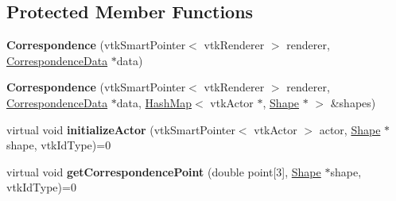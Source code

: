 \subsection*{Protected Member Functions}
\begin{DoxyCompactItemize}
\item 
\hypertarget{class_correspondence_a321ecb3ba208f5db2d5c0f863e6cf09d}{}{\bfseries Correspondence} (vtk\+Smart\+Pointer$<$ vtk\+Renderer $>$ renderer, \hyperlink{class_correspondence_data}{Correspondence\+Data} $\ast$data)\label{class_correspondence_a321ecb3ba208f5db2d5c0f863e6cf09d}

\item 
\hypertarget{class_correspondence_af488f3525bddc4f637ac8696d59d72af}{}{\bfseries Correspondence} (vtk\+Smart\+Pointer$<$ vtk\+Renderer $>$ renderer, \hyperlink{class_correspondence_data}{Correspondence\+Data} $\ast$data, \hyperlink{class_hash_map}{Hash\+Map}$<$ vtk\+Actor $\ast$, \hyperlink{class_shape}{Shape} $\ast$ $>$ \&shapes)\label{class_correspondence_af488f3525bddc4f637ac8696d59d72af}

\item 
\hypertarget{class_correspondence_a98e73443c89db8acd848db19a40f7978}{}virtual void {\bfseries initialize\+Actor} (vtk\+Smart\+Pointer$<$ vtk\+Actor $>$ actor, \hyperlink{class_shape}{Shape} $\ast$shape, vtk\+Id\+Type)=0\label{class_correspondence_a98e73443c89db8acd848db19a40f7978}

\item 
\hypertarget{class_correspondence_a0253e13319957d2547b69196d07ad3ea}{}virtual void {\bfseries get\+Correspondence\+Point} (double point\mbox{[}3\mbox{]}, \hyperlink{class_shape}{Shape} $\ast$shape, vtk\+Id\+Type)=0\label{class_correspondence_a0253e13319957d2547b69196d07ad3ea}

\end{DoxyCompactItemize}
